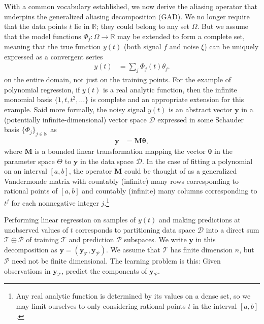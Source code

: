 \documentclass[twocolumn,aps,prx,superscriptaddress,10pt]{revtex4-2}
\newcommand{\by}{\bm{y}}
\newcommand{\y}{\by}  %
\newcommand{\0}{\bm{0}}
\newcommand{\btheta}{\boldsymbol{\theta}}
\newcommand{\D}{\mathcal{D}}
\newcommand{\V}{\mathcal{P}} %
\newcommand{\T}{\mathcal{T}} %
\newcommand{\bbM}{\mathbf{M}}
\newcommand{\R}{\mathbb{R}}
\newcommand{\N}{\mathbb{N}}
\begin{document}
With a common vocabulary established, we now derive the aliasing operator that underpins the generalized aliasing decomposition (GAD).
We no longer require that the data points $t$ lie in $\R$; they could belong to any set $\Omega$.  But we assume that the model functions $\Phi_j:\Omega \to \R$ may be extended to form a complete set, meaning that the true function $y(t)$ (both signal $f$  and noise $\xi$) can be uniquely expressed as a convergent series 
\begin{align}
  y(t) &= \sum_j \Phi_j(t) \theta_j.
\end{align}
 on the entire domain, not just on the training points.  
For the example of polynomial regression, if $y(t)$ is a real analytic  function, then the infinite monomial basis $\{1,t,t^2,\dots\}$ is complete and an appropriate extension for this example.
Said more formally, the noisy signal $y(t)$ is an abstract vector $\y$ in a (potentially infinite-dimensional) vector space $\D$ expressed in some Schauder basis $\{\Phi_j\}_{j\in \N}$ as
\begin{align}\label{eq:define-M}
  \y & = \bbM \btheta,
\end{align}
where $\bbM$ is a bounded linear transformation mapping the vector $\btheta$ in the parameter space $\Theta$ to $\y$ in the data space $\D$. 
In the case of fitting a polynomial on an interval $[a,b]$, the operator $\bbM$ could be thought of as a generalized Vandermonde matrix with countably (infinite) many rows corresponding to rational points of $[a,b]$ and countably (infinite) many columns corresponding to $t^j$ for each nonnegative integer $j$.\footnote{Any real analytic function is determined by its values on a dense set, so we may limit ourselves to only considering rational points $t$ in the interval $[a,b]$.}

Performing linear regression on samples of $y(t)$ and making predictions at unobserved values of $t$ corresponds to partitioning data space $\D$ into a direct sum $\T \oplus \V$ of training $\T$ and prediction $\V$ subspaces. We write $\by$ in this decomposition as $\by = (\by_\T, \by_\V)$.  We assume that $\T$ has finite dimension $n$, but $\V$ need not be finite dimensional. The learning problem is this: Given observations in $\by_\T$, predict the components of $\by_\V$.
\end{document}

